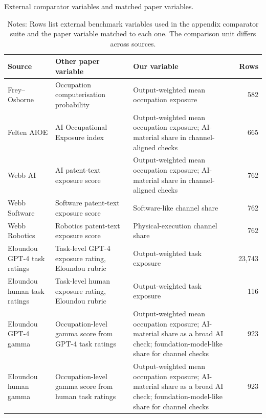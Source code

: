 \begin{table}[H]
\centering
\scriptsize
\setlength{\tabcolsep}{3pt}
\caption{External comparator variables and matched paper variables.}
\begin{tabularx}{\textwidth}{@{}L{0.17\textwidth}L{0.28\textwidth}Xr@{}}
\toprule
Source & Other paper variable & Our variable & Rows \\
\midrule
Frey--Osborne & Occupation computerisation probability & Output-weighted mean occupation exposure & 582 \\
Felten AIOE & AI Occupational Exposure index & Output-weighted mean occupation exposure; AI-material share in channel-aligned checks & 665 \\
Webb AI & AI patent-text exposure score & Output-weighted mean occupation exposure; AI-material share in channel-aligned checks & 762 \\
Webb Software & Software patent-text exposure score & Software-like channel share & 762 \\
Webb Robotics & Robotics patent-text exposure score & Physical-execution channel share & 762 \\
Eloundou GPT-4 task ratings & Task-level GPT-4 exposure rating, Eloundou rubric & Output-weighted task exposure & 23,743 \\
Eloundou human task ratings & Task-level human exposure rating, Eloundou rubric & Output-weighted task exposure & 116 \\
Eloundou GPT-4 gamma & Occupation-level gamma score from GPT-4 task ratings & Output-weighted mean occupation exposure; AI-material share as a broad AI check; foundation-model-like share for channel checks & 923 \\
Eloundou human gamma & Occupation-level gamma score from human task ratings & Output-weighted mean occupation exposure; AI-material share as a broad AI check; foundation-model-like share for channel checks & 923 \\
\bottomrule
\end{tabularx}

\caption*{\scriptsize Notes: Rows list external benchmark variables used in the appendix comparator suite and the paper variable matched to each one. The comparison unit differs across sources.}
\label{tab:appendix_comparator_coverage}
\end{table}
